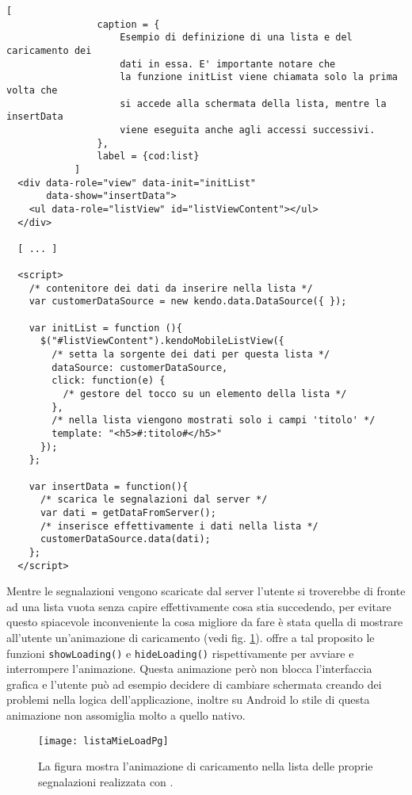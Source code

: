 			\begin{lstlisting}[
				caption = {
					Esempio di definizione di una lista e del caricamento dei 
					dati in essa. E' importante notare che
					la funzione initList viene chiamata solo la prima volta che 
					si accede alla schermata della lista, mentre la insertData 
					viene eseguita anche agli accessi successivi.
				},
				label = {cod:list}
			]
  <div data-role="view" data-init="initList"
       data-show="insertData">
    <ul data-role="listView" id="listViewContent"></ul>    
  </div>

  [ ... ]

  <script>
    /* contenitore dei dati da inserire nella lista */
    var customerDataSource = new kendo.data.DataSource({ });
    
    var initList = function (){
      $("#listViewContent").kendoMobileListView({
        /* setta la sorgente dei dati per questa lista */
        dataSource: customerDataSource, 
        click: function(e) {
          /* gestore del tocco su un elemento della lista */
        },
        /* nella lista viengono mostrati solo i campi 'titolo' */
        template: "<h5>#:titolo#</h5>" 
      }); 
    };
	
    var insertData = function(){
      /* scarica le segnalazioni dal server */
      var dati = getDataFromServer();
      /* inserisce effettivamente i dati nella lista */ 
      customerDataSource.data(dati); 
    };
  </script>	
			\end{lstlisting}
			
			\noindent Mentre le segnalazioni vengono scaricate dal server l'utente si 
			troverebbe di fronte ad una lista vuota senza capire effettivamente 
			cosa stia succedendo, per evitare questo spiacevole inconveniente 
			la cosa migliore da fare è stata quella di mostrare all'utente un'animazione 
			di caricamento (vedi fig. \ref{fig:listaMieLoadPg}). \kendomob{} offre a tal proposito le funzioni
			\texttt{showLoading()} e \texttt{hideLoading()} rispettivamente per 
			avviare e interrompere l'animazione. Questa animazione però non blocca 
			l'interfaccia grafica e l'utente può ad esempio decidere 
			di cambiare schermata creando dei problemi nella logica dell'applicazione, 
			inoltre su Android lo stile di questa animazione non assomiglia molto
			a quello nativo.
			
			\begin{figure}[H]
				\centering
				\texttt{[image: listaMieLoadPg]}
				\caption{La figura mostra l'animazione di caricamento nella lista 
				delle proprie segnalazioni realizzata con \kendomob{}.
				}
				\label{fig:listaMieLoadPg}
			\end{figure}
			
